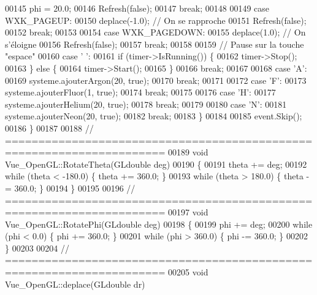 \begin{DoxyCode}
00145     phi   = 20.0;
00146     Refresh(\textcolor{keyword}{false});
00147     \textcolor{keywordflow}{break};
00148 
00149   \textcolor{keywordflow}{case} WXK\_PAGEUP:
00150     deplace(-1.0);    \textcolor{comment}{// On se rapproche}
00151     Refresh(\textcolor{keyword}{false});
00152     \textcolor{keywordflow}{break};
00153 
00154   \textcolor{keywordflow}{case} WXK\_PAGEDOWN:
00155     deplace(1.0);     \textcolor{comment}{// On s'éloigne}
00156     Refresh(\textcolor{keyword}{false});
00157     \textcolor{keywordflow}{break};
00158 
00159   \textcolor{comment}{// Pause sur la touche "espace"}
00160   \textcolor{keywordflow}{case} \textcolor{charliteral}{' '}:
00161     \textcolor{keywordflow}{if} (timer->IsRunning()) \{
00162       timer->Stop();
00163     \} \textcolor{keywordflow}{else} \{
00164       timer->Start();
00165     \}
00166     \textcolor{keywordflow}{break};
00167     
00168   \textcolor{keywordflow}{case} \textcolor{charliteral}{'A'}:
00169     systeme.ajouterArgon(20, \textcolor{keyword}{true});
00170     \textcolor{keywordflow}{break};
00171   
00172   \textcolor{keywordflow}{case} \textcolor{charliteral}{'F'}:
00173     systeme.ajouterFluor(1, \textcolor{keyword}{true});
00174     \textcolor{keywordflow}{break};
00175   
00176   \textcolor{keywordflow}{case} \textcolor{charliteral}{'H'}:
00177     systeme.ajouterHelium(20, \textcolor{keyword}{true});
00178     \textcolor{keywordflow}{break};
00179   
00180   \textcolor{keywordflow}{case} \textcolor{charliteral}{'N'}:
00181     systeme.ajouterNeon(20, \textcolor{keyword}{true});
00182     \textcolor{keywordflow}{break};
00183   \}
00184   
00185   \textcolor{keyword}{event}.Skip();
00186 \}
00187 
00188 \textcolor{comment}{// ======================================================================}
00189 \textcolor{keywordtype}{void} Vue_OpenGL::RotateTheta(GLdouble deg)
00190 \{
00191   theta += deg;
00192   \textcolor{keywordflow}{while} (theta < -180.0) \{ theta += 360.0; \}
00193   \textcolor{keywordflow}{while} (theta >  180.0) \{ theta -= 360.0; \}
00194 \}
00195 
00196 \textcolor{comment}{// ======================================================================}
00197 \textcolor{keywordtype}{void} Vue_OpenGL::RotatePhi(GLdouble deg)
00198 \{
00199   phi += deg;
00200   \textcolor{keywordflow}{while} (phi <   0.0) \{ phi += 360.0; \}
00201   \textcolor{keywordflow}{while} (phi > 360.0) \{ phi -= 360.0; \}
00202 \}
00203 
00204 \textcolor{comment}{// ======================================================================}
00205 \textcolor{keywordtype}{void} Vue_OpenGL::deplace(GLdouble dr)

\end{DoxyCode}
